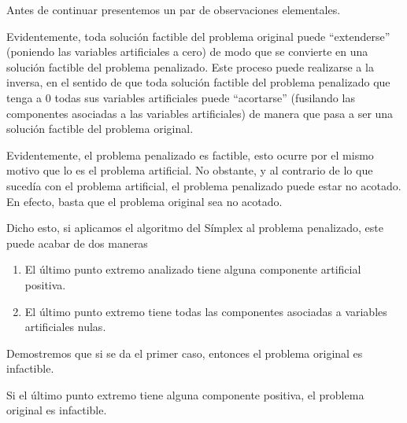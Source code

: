 Antes de continuar presentemos un par de observaciones elementales.
\begin{obs}
	Evidentemente, toda solución factible del problema original puede ``extenderse'' (poniendo las variables artificiales a cero) de modo que se convierte en una solución factible del problema penalizado. Este proceso puede realizarse a la inversa, en el sentido de que toda solución factible del problema penalizado que tenga a $0$ todas sus variables artificiales puede ``acortarse'' (fusilando las componentes asociadas a las variables artificiales) de manera que pasa a ser una solución factible del problema original.
\end{obs}
\begin{obs}[Sutilezas]
	Evidentemente, el problema penalizado es factible, esto ocurre por el mismo motivo que lo es el problema artificial. No obstante, y al contrario de lo que sucedía con el problema artificial, el problema penalizado puede estar no acotado. En efecto, basta que el problema original sea no acotado.
\end{obs}
Dicho esto, si aplicamos el algoritmo del Símplex al problema penalizado, este puede acabar de dos maneras
\begin{enumerate}
	\item El último punto extremo analizado tiene alguna componente artificial positiva.
	\item El último punto extremo tiene todas las componentes asociadas a variables artificiales nulas.
\end{enumerate}
Demostremos que si se da el primer caso, entonces el problema original es infactible.
\begin{prop}
	Si el último punto extremo tiene alguna componente positiva, el problema original es infactible.
\end{prop}
